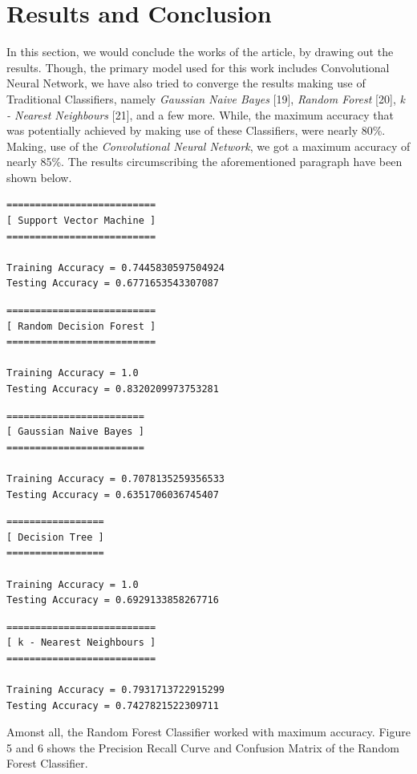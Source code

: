 \documentclass[conference]{IEEEtran}
\begin{document}
\section{Results and Conclusion}
In this section, we would conclude the works of the article, by drawing out the results. Though, the primary model used for this work includes Convolutional Neural Network, we have also tried to converge the results making use of Traditional Classifiers, namely \textit{Gaussian Naive Bayes} [19], \textit{Random Forest} [20], \textit{k - Nearest Neighbours} [21], and a few more. While, the maximum accuracy that was potentially achieved by making use of these Classifiers, were nearly 80\%. Making, use of the \textit{Convolutional Neural Network}, we got a maximum accuracy of nearly 85\%. The results circumscribing the aforementioned paragraph have been shown below. 
\begin{verbatim}
==========================
[ Support Vector Machine ]
==========================

Training Accuracy = 0.7445830597504924
Testing Accuracy = 0.6771653543307087

\end{verbatim}
\begin{verbatim}
==========================
[ Random Decision Forest ]
==========================

Training Accuracy = 1.0
Testing Accuracy = 0.8320209973753281

\end{verbatim}
\begin{verbatim}
========================
[ Gaussian Naive Bayes ]
========================

Training Accuracy = 0.7078135259356533
Testing Accuracy = 0.6351706036745407

\end{verbatim}
\begin{verbatim}
=================
[ Decision Tree ]
=================

Training Accuracy = 1.0
Testing Accuracy = 0.6929133858267716

\end{verbatim}
\begin{verbatim}
==========================
[ k - Nearest Neighbours ]
==========================

Training Accuracy = 0.7931713722915299
Testing Accuracy = 0.7427821522309711

\end{verbatim}
Amonst all, the Random Forest Classifier worked with maximum accuracy. Figure 5 and 6 shows the Precision Recall Curve and Confusion Matrix of the Random Forest Classifier. 
\end{document}
